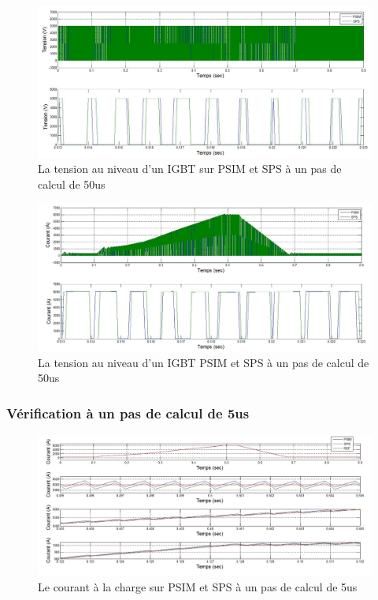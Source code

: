 \documentclass[11pt,letterpaper,final]{report}
\begin{document}
\begin{figure}[h!]
\centering
\includegraphics[scale=0.5]{Fig/Hacheur4Quadrants/HacheurTensionIGBT50u.jpg}
\caption{La tension au niveau d'un IGBT sur PSIM et SPS à un pas de calcul de 50us}
\label{hc_IG_ten_50}
\end{figure}

\begin{figure}[h!]
\centering
\includegraphics[scale=0.5]{Fig/Hacheur4Quadrants/HacheurCourantIGBT50u.jpg}
\caption{La tension au niveau d'un IGBT PSIM et SPS à un pas de calcul de 50us}
\label{hc_IG_cou_50}
\end{figure}
\clearpage
\subsubsection{Vérification à un pas de calcul de 5us}


\begin{figure}[h!]
\centering
\includegraphics[scale=0.5]{Fig/Hacheur4Quadrants/HacheurCourantCharge5u.jpg}
\caption{Le courant à la charge sur PSIM et SPS à un pas de calcul de 5us}
\label{hc_cou_ch_5}
\end{figure}
\end{document}
